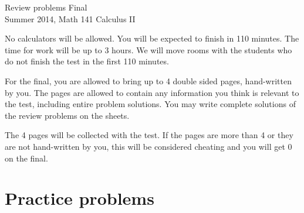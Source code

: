 \documentclass{article}
\begin{document}
\begin{center}
\Large
Review problems Final\\ Summer 2014, Math 141 Calculus II \\
\end{center}


\noindent No calculators will be allowed. You will be expected to finish in 110 minutes. The time for work will be up to 3 hours. We will move rooms with the students who do not finish the test in the first 110 minutes.

For the final, you are allowed to bring up to 4 double sided pages, hand-written by you. The pages are allowed to contain any information you think is relevant to the test, including entire problem solutions. You may write complete solutions of the review problems on the sheets.

The 4 pages will be collected with the test. If the pages are more than 4 or they are not hand-written by you, this will be considered cheating and you will get 0 on the final.
\section{Practice problems}
\end{document}
